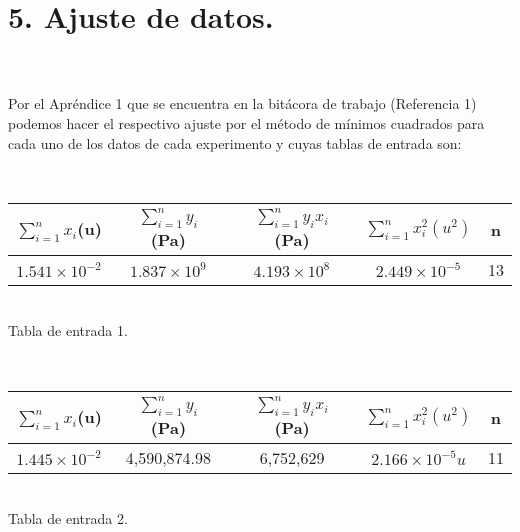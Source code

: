\documentclass[10pt,a4paper]{article}
\begin{document}
\section*{5. Ajuste de datos.}\\
\\
Por el Apr\'{e}ndice 1 que se encuentra en la bit\'{a}cora de trabajo (Referencia 1) podemos hacer el respectivo ajuste por el m\'{e}todo de m\'{i}nimos cuadrados para cada uno de los datos de cada experimento y cuyas tablas de entrada son:
\\
\medskip 
\medskip 
\begin{figure 6}
\centering
\\
\begin{tabular}{|c|c|c|c|c|}
\hline 
$\sum _{ i=1 }^{ n }{ { x }_{ i } } $(u) & $\sum _{ i=1 }^{ n }{ { y }_{ i } } $ (Pa) & $ \sum _{ i=1 }^{ n }{ { y }_{ i } } { x }_{ i }$ (Pa) & $\sum _{ i=1 }^{ n }{ { x }_{ i }^{ 2 } }({ u }^{ 2 })$ & n \\ 

\hline 
$1.541\times { 10 }^{ -2 }$& $1.837\times { 10 }^{ 9 }$ & $4.193\times { 10 }^{ 8 }$ & $2.449\times { 10 }^{ -5 }$& 13 \\ 
\hline 
\end{tabular} 
\\
\caption{Tabla de entrada 1.}
\\
\medskip  
\medskip 
\centering
\begin{tabular}{|c|c|c|c|c|}
\hline 
$\sum _{ i=1 }^{ n }{ { x }_{ i } } $(u) & $\sum _{ i=1 }^{ n }{ { y }_{ i } } $ (Pa) & $ \sum _{ i=1 }^{ n }{ { y }_{ i } } { x }_{ i }$ (Pa) & $\sum _{ i=1 }^{ n }{ { x }_{ i }^{ 2 } }({ u }^{ 2 })$ & n \\ 
\hline 
$1.445\times { 10 }^{ -2 }$& 4,590,874.98 & 6,752,629 & $2.166\times { 10 }^{ -5 }u$& 11 \\ 
\hline 
\end{tabular} 
\\
\caption{Tabla de entrada 2.}
\\
\end{figure 6}
\\
\end{document}
